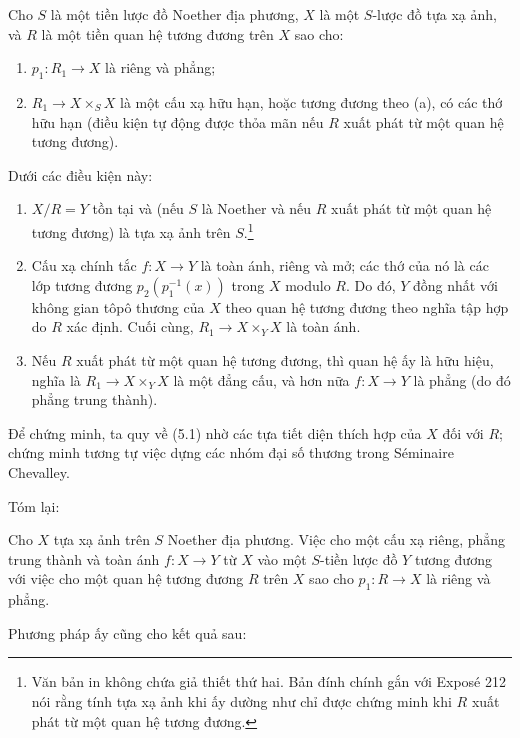  Cho $S$ là một tiền lược đồ Noether địa phương, $X$ là
một $S$-lược đồ tựa xạ ảnh, và $R$ là một tiền quan hệ tương đương trên $X$
sao cho:
\begin{enumerate}
\item[(a)] $p_1:R_1\to X$ là riêng và phẳng;
\item[(b)] $R_1\to X\times_S X$ là một cấu xạ hữu hạn, hoặc tương đương theo
(a), có các thớ hữu hạn (điều kiện tự động được thỏa mãn nếu $R$ xuất phát từ
một quan hệ tương đương).
\end{enumerate}
Dưới các điều kiện này:
\begin{enumerate}
\item[(i)] $X/R=Y$ tồn tại và (nếu $S$ là Noether và nếu $R$ xuất phát từ một
quan hệ tương đương) là tựa xạ ảnh trên $S$.\footnote{Văn bản in không chứa
giả thiết thứ hai. Bản đính chính gắn với
Exposé 212 nói rằng tính tựa xạ ảnh khi ấy dường như chỉ được chứng minh khi
$R$ xuất phát từ một quan hệ tương đương.}

\item[(ii)] Cấu xạ chính tắc $f:X\to Y$ là toàn ánh, riêng và mở; các thớ của
nó là các lớp tương đương $p_2(p_1^{-1}(x))$ trong $X$ modulo $R$. Do đó,
$Y$ đồng nhất với không gian tôpô thương của $X$ theo quan hệ tương đương theo
nghĩa tập hợp do $R$ xác định. Cuối cùng,
$R_1\to X\times_Y X$ là toàn ánh.

\item[(iii)] Nếu $R$ xuất phát từ một quan hệ tương đương, thì quan hệ ấy là
hữu hiệu, nghĩa là $R_1\to X\times_Y X$ là một đẳng cấu, và hơn nữa
$f:X\to Y$ là phẳng (do đó phẳng trung thành).
\end{enumerate}

Để chứng minh, ta quy về (5.1) nhờ các tựa tiết diện thích hợp của $X$ đối với
$R$; chứng minh tương tự việc dựng các nhóm đại số thương trong Séminaire
Chevalley.

Tóm lại:

 Cho $X$ tựa xạ ảnh trên $S$ Noether địa phương. Việc cho
một cấu xạ riêng, phẳng trung thành và toàn ánh $f:X\to Y$ từ $X$ vào một
$S$-tiền lược đồ $Y$ tương đương với việc cho một quan hệ tương đương $R$ trên
$X$ sao cho $p_1:R\to X$ là riêng và phẳng.

Phương pháp ấy cũng cho kết quả sau:

